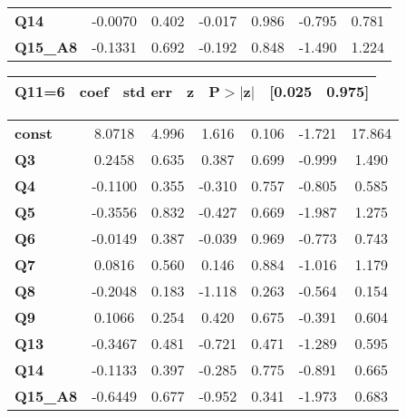 \begin{center}
\begin{tabular}{lcccccc}
\textbf{Q14}     &      -0.0070  &        0.402     &    -0.017  &         0.986        &       -0.795    &        0.781     \\
\textbf{Q15\_A8} &      -0.1331  &        0.692     &    -0.192  &         0.848        &       -1.490    &        1.224     \\
\bottomrule
\end{tabular}
\newpage
\begin{tabular}{ccccccc}
 \textbf{Q11=6}  & \textbf{coef} & \textbf{std err} & \textbf{z} & \textbf{P$> |$z$|$} & \textbf{[0.025} & \textbf{0.975]}  \\
\midrule
\bottomrule
\end{tabular}
\begin{tabular}{lcccccc}
\textbf{const}   &       8.0718  &        4.996     &     1.616  &         0.106        &       -1.721    &       17.864     \\
\textbf{Q3}      &       0.2458  &        0.635     &     0.387  &         0.699        &       -0.999    &        1.490     \\
\textbf{Q4}      &      -0.1100  &        0.355     &    -0.310  &         0.757        &       -0.805    &        0.585     \\
\textbf{Q5}      &      -0.3556  &        0.832     &    -0.427  &         0.669        &       -1.987    &        1.275     \\
\textbf{Q6}      &      -0.0149  &        0.387     &    -0.039  &         0.969        &       -0.773    &        0.743     \\
\textbf{Q7}      &       0.0816  &        0.560     &     0.146  &         0.884        &       -1.016    &        1.179     \\
\textbf{Q8}      &      -0.2048  &        0.183     &    -1.118  &         0.263        &       -0.564    &        0.154     \\
\textbf{Q9}      &       0.1066  &        0.254     &     0.420  &         0.675        &       -0.391    &        0.604     \\
\textbf{Q13}     &      -0.3467  &        0.481     &    -0.721  &         0.471        &       -1.289    &        0.595     \\
\textbf{Q14}     &      -0.1133  &        0.397     &    -0.285  &         0.775        &       -0.891    &        0.665     \\
\textbf{Q15\_A8} &      -0.6449  &        0.677     &    -0.952  &         0.341        &       -1.973    &        0.683     \\

\end{tabular}
\end{center}
